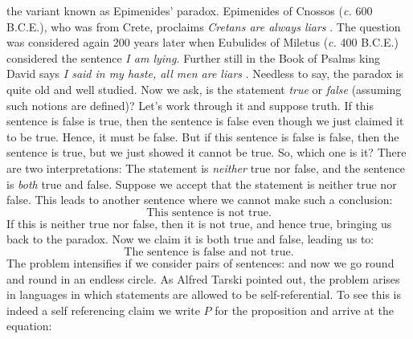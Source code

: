         the variant known as Epimenides' paradox.
        Epimenides of Cnossos (\textit{c.} 600 B.C.E.), who was from Crete,
        proclaims \textit{Cretans are always liars} \cite{KingJamesBible}. The
        question was considered again 200 years later when Eubulides of Miletus
        (\textit{c.} 400 B.C.E.) considered the sentence \textit{I am lying.}
        Further still in the Book of Psalms king David says
        \textit{I said in my haste, all men are liars} \cite{KingJamesBible}.
        Needless to say, the paradox is quite old and well studied. Now we ask,
        is the statement \textit{true} or \textit{false} (assuming such notions
        are defined)? Let's work through it and suppose truth. If this sentence
        is false is true, then the sentence is false even though we just claimed
        it to be true. Hence, it must be false. But if this sentence is false is
        false, then the sentence is true, but we just showed it cannot be true.
        So, which one is it? There are two interpretations: The statement is
        \textit{neither} true nor false, and the sentence is \textit{both} true
        and false. Suppose we accept that the statement is neither true nor
        false. This leads to another sentence where we cannot make such a
        conclusion:
        \begin{equation}
            \text{This sentence is not true.}
        \end{equation}
        If this is neither true nor false, then it is not true, and hence true,
        bringing us back to the paradox. Now we claim it is both true and false,
        leading us to:
        \begin{equation}
            \text{The sentence is false and not true.}
        \end{equation}
        The problem intensifies if we consider pairs of sentences:
        {%
            \label{eqn:That_Statement_Is_False}%
        }
        and now we go round and round in an endless circle. As Alfred Tarski
        pointed out, the problem arises in languages in which statements are
        allowed to be self-referential. To see this is indeed a self
        referencing claim we write $P$ for the proposition and arrive at the
        equation:
